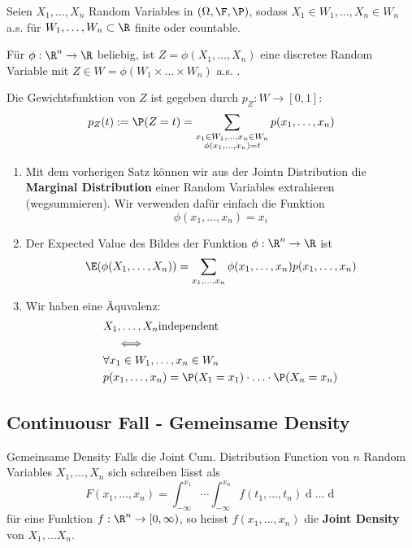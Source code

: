 \begin{subbox}{}
    Seien $X_1, \ldots, X_n$  Random Variables in $(\Omega, \F, \P)$, sodass $X_1 \in W_1, \ldots, X_n \in W_n$ a.s. für $W_1, \ldots, W_n \subset \R$ finite oder countable.

    Für $\phi: \R^n \to \R$ beliebig, ist $Z = \phi(X_1, \ldots, X_n)$ eine discretee Random Variable mit $Z \in W = \phi(W_1 \times \ldots \times W_n)$ a.s. . 

    Die Gewichtsfunktion von $Z$ ist gegeben durch $p_Z: W \to [0,1]$:
    $$p_Z(t) := \P(Z = t) = \sum_{\substack{x_1 \in W_1, \ldots, x_n \in W_n\\ \phi(x_1, \ldots, x_n) = t}} p(x_1, \ldots, x_n)$$
\end{subbox}
\begin{enumerate}
    \item Mit dem vorherigen Satz können wir aus der Jointn Distribution die \textbf{Marginal Distribution} einer Random Variables extrahieren (wegsummieren). Wir verwenden dafür einfach die Funktion 
    $$\phi(x_1, \ldots, x_n) = x_i$$
    \item Der Expected Value des Bildes der Funktion $\phi: \R^n \to \R$ ist
    $$\E(\phi(X_1, \ldots, X_n)) = \sum_{x_1, \ldots, x_n}\phi(x_1, \ldots, x_n)p(x_1, \ldots, x_n)$$
    \item Wir haben eine Äquvalenz: 
    \begin{align*}
        &X_1, \ldots, X_n \text{independent}\\
        &\quad \iff \\
        &\forall x_1 \in W_1, \ldots, x_n \in W_n\\
        &p(x_1, \ldots, x_n) = \P(X_1 = x_1) \cdot \ldots \cdot \P(X_n = x_n)
    \end{align*}
\end{enumerate}

\subsection{Continuousr Fall - Gemeinsame Density}
\begin{mainbox}{Gemeinsame Density}
    Falls die Joint Cum. Distribution Function von $n$ Random Variables $X_1, \ldots, X_n$ sich schreiben lässt als
    $$F(x_1, \ldots, x_n) = \int_{-\infty}^{x_1} \cdots \int_{-\infty}^{x_n}f(t_1, \ldots, t_n) \mathop{dt_n}\ldots\mathop{dt_1}$$
    für eine Funktion $f: \R^n \to [0, \infty)$, so heisst $f(x_1, \ldots, x_n)$ die \textbf{Joint Density} von $X_1, \ldots X_n$.
\end{mainbox}
   
